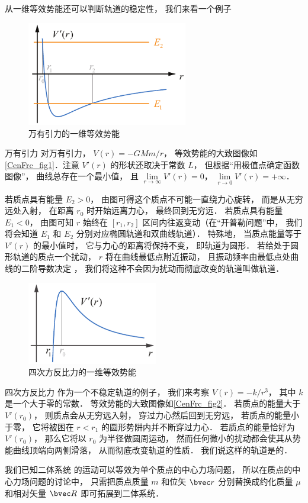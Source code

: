 从一维等效势能还可以判断轨道的稳定性， 我们来看一个例子

\begin{figure}[ht]
\centering
\includegraphics[width=7cm]{./figures/CenFrc1.pdf}
\caption{万有引力的一维等效势能} \label{CenFrc_fig1}
\end{figure}

\begin{example}{万有引力}
对万有引力， $V(r) = -GMm/r$， 等效势能的大致图像如\autoref{CenFrc_fig1}．注意 $V'(r)$ 的形状还取决于常数 $L$， 但根据“用极值点确定函数图像”， 曲线总存在一个最小值， 且 $\lim\limits_{r\to\infty}V'(r) = 0$， $\lim\limits_{r\to 0} V'(r) = +\infty$．

若质点具有能量 $E_2 > 0$， 由图可得这个质点不可能一直绕力心旋转， 而是从无穷远处入射， 在距离 $r_0$ 时开始远离力心， 最终回到无穷远． 若质点具有能量 $E_1 < 0$， 由图可知 $r$ 始终在 $[r_1, r_2]$ 区间内往返变动（在“开普勒问题”中， 我们将会知道 $E_1$ 和 $E_2$ 分别对应椭圆轨道和双曲线轨道）． 特殊地， 当质点能量等于 $V'(r)$ 的最小值时， 它与力心的距离将保持不变， 即轨道为圆形． 若给处于圆形轨道的质点一个扰动， $r$ 将在曲线最低点附近振动， 且振动频率由最低点处曲线的二阶导数决定%
， 我们将这种不会因为扰动而彻底改变的轨道叫做轨道．
\end{example}

\begin{figure}[ht]
\centering
\includegraphics[width=5.7cm]{./figures/CenFrc2.pdf}
\caption{四次方反比力的一维等效势能} \label{CenFrc_fig2}
\end{figure}

\begin{example}{四次方反比力}
作为一个不稳定轨道的例子， 我们来考察 $V(r) = -k/r^3$， 其中 $k$ 是一个大于零的常数． 等效势能的大致图像如\autoref{CenFrc_fig2}． 若质点的能量大于 $V'(r_0)$， 则质点会从无穷远入射， 穿过力心然后回到无穷远， 若质点的能量小于零， 它将被困在 $r < r_1$ 的圆形势阱内并不断穿过力心． 若质点的能量恰好为 $V'(r_0)$， 那么它将以 $r_0$ 为半径做圆周运动， 然而任何微小的扰动都会使其从势能曲线顶端向两侧滑落， 从而彻底改变轨道的性质． 我们说这样的轨道是的．
\end{example}

我们已知二体系统 的运动可以等效为单个质点的中心力场问题， 所以在质点的中心力场问题的讨论中， 只需把质点质量 $m$ 和位矢 $\bvec r$ 分别替换成约化质量 $\mu$ 和相对矢量 $\bvec R$ 即可拓展到二体系统．

